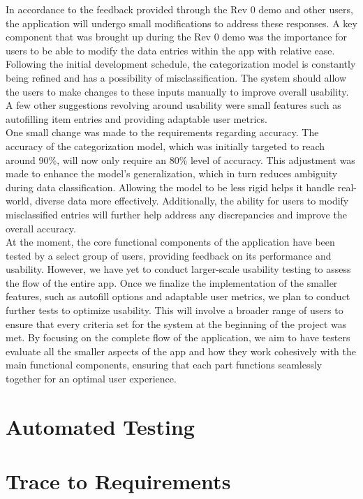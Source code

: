 \documentclass[12pt, titlepage]{article}
\begin{document}
In accordance to the feedback provided through the Rev 0 demo and other users, the application will undergo small modifications to address these responses. 
A key component that was brought up during the Rev 0 demo was the importance for users to be able to modify the data entries within the app with relative ease.
Following the initial development schedule, the categorization model is constantly being refined and has a possibility of misclassification. The system should 
allow the users to make changes to these inputs manually to improve overall usability. A few other suggestions revolving around usability were small features such as
autofilling item entries and providing adaptable user metrics.\\

One small change was made to the requirements regarding accuracy. The accuracy of the categorization model, which was initially targeted to reach around 90\%, 
will now only require an 80\% level of accuracy. This adjustment was made to enhance the model’s generalization, which in turn reduces ambiguity during data 
classification. Allowing the model to be less rigid helps it handle real-world, diverse data more effectively. Additionally, the ability for users to modify 
misclassified entries will further help address any discrepancies and improve the overall accuracy.\\

At the moment, the core functional components of the application have been tested by a select group of users, providing feedback on its performance and usability. 
However, we have yet to conduct larger-scale usability testing to assess the flow of the entire app. Once we finalize the implementation of the smaller 
 features, such as autofill options and adaptable user metrics, we plan to conduct further tests to optimize usability. This will involve a broader range of users to ensure 
 that every criteria set for the system at the beginning of the project was met. By focusing on the complete flow of the application, we aim
to have testers evaluate all the smaller aspects of the app and how they work cohesively with the main functional components, ensuring that each part functions 
seamlessly together for an optimal user experience.

\section{Automated Testing}
		
\section{Trace to Requirements}
		
\end{document}
